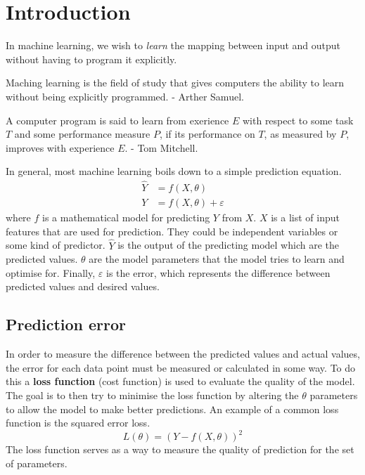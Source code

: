 \documentclass[CS5104-Notes.tex]{subfiles}
\begin{document}
\section{Introduction}
In machine learning, we wish to \textit{learn} the mapping between input and output without having to program it explicitly.

\begin{displayquote}
Maching learning is the field of study that gives computers the ability to learn without being explicitly programmed. - Arther Samuel.
\end{displayquote}

\begin{displayquote}
A computer program is said to learn from exerience $E$ with respect to some task $T$ and some performance measure $P$, if its performance on $T$, as measured by $P$, improves with experience $E$. - Tom Mitchell.
\end{displayquote}
\noindent
In general, most machine learning boils down to a simple prediction equation.
\begin{align}
  \hat Y &= f(X, \theta) \\
  Y &= f(X, \theta) + \varepsilon
\end{align}
where $f$ is a mathematical model for predicting $Y$ from $X$. $X$ is a list of input features that are used for prediction. They could be independent variables or some kind of predictor. $\hat Y$ is the output of the predicting model which are the predicted values. $\theta$ are the model parameters that the model tries to learn and optimise for. Finally, $\varepsilon$ is the error, which represents the difference between predicted values and desired values.

\subsection{Prediction error}
In order to measure the difference between the predicted values and actual values, the error for each data point must be measured or calculated in some way. To do this a \textbf{loss function} (cost function) is used to evaluate the quality of the model. The goal is to then try to minimise the loss function by altering the $\theta$ parameters to allow the model to make better predictions.
\n
An example of a common loss function is the squared error loss.
\begin{equation}
L(\theta) = (Y - f(X, \theta))^2
\end{equation}
The loss function serves as a way to measure the quality of prediction for the set of parameters.
\end{document}
